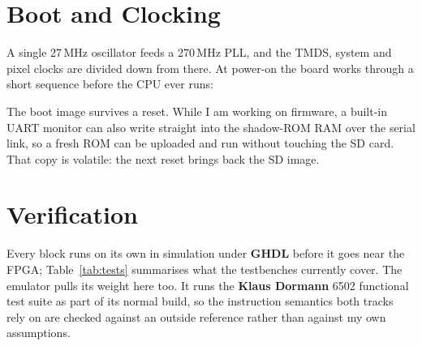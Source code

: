 \documentclass[11pt,a4paper]{article}
\begin{document}
\section{Boot and Clocking}

A single 27\,MHz oscillator feeds a 270\,MHz PLL, and the TMDS, system
and pixel clocks are divided down from there. At power-on the board works
through a short sequence before the CPU ever runs:

\vspace{0.3em}
\vspace{0.3em}

The boot image survives a reset. While I am working on firmware, a
built-in UART monitor can also write straight into the shadow-ROM RAM
over the serial link, so a fresh ROM can be uploaded and run without
touching the SD card. That copy is volatile: the next reset brings back
the SD image.

\section{Verification}

Every block runs on its own in simulation under \textbf{GHDL} before it
goes near the FPGA; Table~\ref{tab:tests} summarises what the testbenches
currently cover. The emulator pulls its weight here too. It runs the
\textbf{Klaus Dormann} 6502 functional test suite as part of its normal
build, so the instruction semantics both tracks rely on are checked
against an outside reference rather than against my own assumptions.
\end{document}
